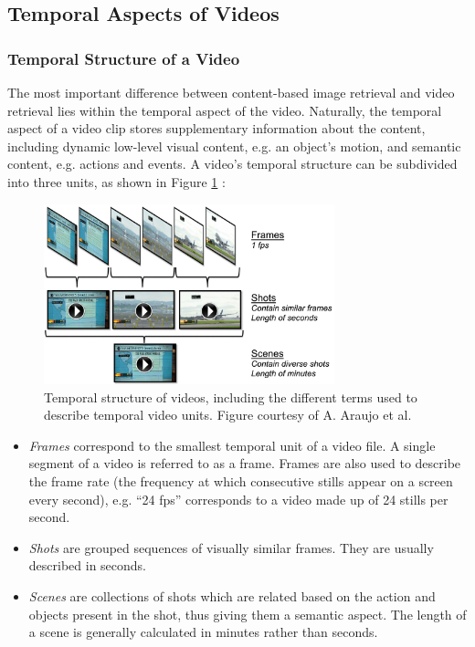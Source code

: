 
\subsection{Temporal Aspects of Videos}
\label{sec:temporal-aspect-videos}

\subsubsection{Temporal Structure of a Video}

The most important difference between content-based image retrieval and video retrieval lies within the temporal aspect of the video. Naturally, the temporal aspect of a video clip stores supplementary information about the content, including dynamic low-level visual content, e.g. an object's motion, and semantic content, e.g. actions and events. A video's temporal structure can be subdivided into three units, as shown in Figure \ref{fig:temporal_structure} \cite{araujo2017i2v}:

\begin{figure}[h]
\centerline{\includegraphics[width=0.75\textwidth]{figures/litsurvey/temporal_structure_videos.png}}
\caption{\label{fig:temporal_structure}Temporal structure of videos, including the different terms used to describe temporal video units. Figure courtesy of A. Araujo et al.}
\end{figure}

\begin{itemize}
    \item \textit{Frames} correspond to the smallest temporal unit of a video file. A single segment of a video is referred to as a frame. Frames are also used to describe the frame rate (the frequency at which consecutive stills appear on a screen every second), e.g. ``24 fps'' corresponds to a video made up of 24 stills per second.
    \item \textit{Shots} are grouped sequences of visually similar frames. They are usually described in seconds.
    \item \textit{Scenes} are collections of shots which are related based on the action and objects present in the shot, thus giving them a semantic aspect. The length of a scene is generally calculated in minutes rather than seconds.
\end{itemize}

